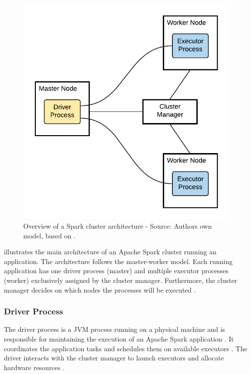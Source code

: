 \begin{figure}[h]
\centering
\includegraphics[scale=1]{images/04_technical_background/spark/spark_cluster_architecture}
\caption{Overview of a Spark cluster architecture - Source: Authors own model, based on \cite{Apache2020Spark}.}
\label{fig:spark_cluster_overview}
\end{figure}

 illustrates the main architecture of an Apache Spark cluster running an application.
The architecture follows the master-worker model.
Each running application has one driver process (master) and multiple executor processes (worker) exclusively assigned by the cluster manager.
Furthermore, the cluster manager decides on which nodes the processes will be executed \cite{Hien2018Spark}.


\subsubsection{Driver Process}
\label{subsubsec:04_spark_architecture_driver}
The driver process is a JVM process running on a physical machine and is responsible for maintaining the execution of an Apache Spark application \cite{Chambers2018Spark}. It coordinates the application tasks and schedules them on available executors \cite{Hien2018Spark}. 
The driver interacts with the cluster manager to launch executors and allocate hardware resources \cite{Chambers2018Spark, Hien2018Spark}.


